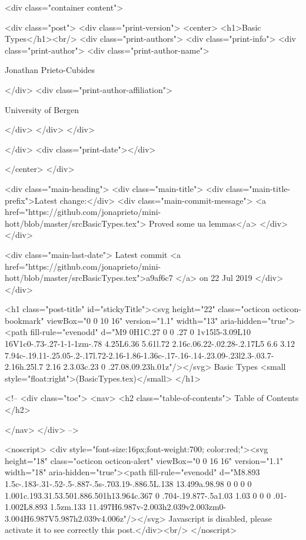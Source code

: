       <div class="container content">
        







<div class="post">
  <div class="print-version">
    <center>
      <h1>Basic Types</h1><br/>
        <div class="print-authors">
          <div class="print-info">
            <div class="print-author">
              <div class="print-author-name">
                
                  Jonathan Prieto-Cubides
                
              </div>
              <div class="print-author-affiliation">
                
                  University of Bergen
                
                </div>
            </div>
          </div>
          
          
        </div>
        <div class="print-date"></div>
        
        
    </center>
  </div>

  
  <div class="main-heading">
    <div class="main-title">
      <div class="main-title-prefix">Latest change:</div>
      <div class="main-commit-message">
            <a href="https://github.com/jonaprieto/mini-hott/blob/master/srcBasicTypes.tex">
              Proved some ua lemmas</a>
      </div>
    </div>

    <div class="main-last-date">
      Latest commit <a href="https://github.com/jonaprieto/mini-hott/blob/master/srcBasicTypes.tex">a9af6c7 </a> on  22 Jul 2019
    </div>
  </div>
  

  <h1 class="post-title" id="stickyTitle"><svg height="22" class="octicon octicon-bookmark" viewBox="0 0 10 16" version="1.1" width="13" aria-hidden="true"><path fill-rule="evenodd" d="M9 0H1C.27 0 0 .27 0 1v15l5-3.09L10 16V1c0-.73-.27-1-1-1zm-.78 4.25L6.36 5.61l.72 2.16c.06.22-.02.28-.2.17L5 6.6 3.12 7.94c-.19.11-.25.05-.2-.17l.72-2.16-1.86-1.36c-.17-.16-.14-.23.09-.23l2.3-.03.7-2.16h.25l.7 2.16 2.3.03c.23 0 .27.08.09.23h.01z"/></svg> Basic Types <small style="float:right">(BasicTypes.tex)</small>
  </h1>

  <!-- 
  <div class="toc">
    <nav>
    <h2 class="table-of-contents"> Table of Contents </h2>
      

    </nav>
  </div>
   -->

  <noscript>
  <div style="font-size:16px;font-weight:700; color:red;"><svg height="18" class="octicon octicon-alert" viewBox="0 0 16 16" version="1.1" width="18" aria-hidden="true"><path fill-rule="evenodd" d="M8.893 1.5c-.183-.31-.52-.5-.887-.5s-.703.19-.886.5L.138 13.499a.98.98 0 0 0 0 1.001c.193.31.53.501.886.501h13.964c.367 0 .704-.19.877-.5a1.03 1.03 0 0 0 .01-1.002L8.893 1.5zm.133 11.497H6.987v-2.003h2.039v2.003zm0-3.004H6.987V5.987h2.039v4.006z"/></svg> Javascript is disabled, please activate it to see correctly this post.</div><br/>
  </noscript>

